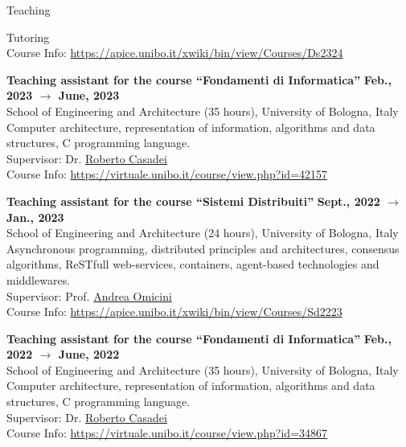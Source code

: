 \documentclass{resume} %
\begin{document}
\begin{rSection}{Teaching}
\begin{rSubsection2}{Tutoring}
            \\Course Info: \url{https://apice.unibo.it/xwiki/bin/view/Courses/Ds2324}
            \item\textbf{ Teaching assistant for the course ``Fondamenti di Informatica'' }\hfill \textbf{Feb., 2023 $\rightarrow$ June, 2023}
            \\School of Engineering and Architecture (35 hours), University of Bologna, Italy
            \\Computer architecture, representation of information, algorithms and data structures, C programming language.
            \\Supervisor: Dr. \href{mailto:roberto.casadei@unibo.it}{Roberto Casadei}
            \\Course Info: \url{https://virtuale.unibo.it/course/view.php?id=42157}
            \item\textbf{ Teaching assistant for the course ``Sistemi Distribuiti'' }\hfill \textbf{Sept., 2022 $\rightarrow$ Jan., 2023}
            \\School of Engineering and Architecture (24 hours), University of Bologna, Italy
            \\Asynchronous programming, distributed principles and architectures, consensus algorithms, ReSTfull web-services, containers, agent-based technologies and middlewares.
            \\Supervisor: Prof. \href{mailto:andrea.omicini@unibo.it}{Andrea Omicini}
            \\Course Info: \url{https://apice.unibo.it/xwiki/bin/view/Courses/Sd2223}
            \item\textbf{ Teaching assistant for the course ``Fondamenti di Informatica'' }\hfill \textbf{Feb., 2022 $\rightarrow$ June, 2022}
            \\School of Engineering and Architecture (35 hours), University of Bologna, Italy
            \\Computer architecture, representation of information, algorithms and data structures, C programming language.
            \\Supervisor: Dr. \href{mailto:roberto.casadei@unibo.it}{Roberto Casadei}
            \\Course Info: \url{https://virtuale.unibo.it/course/view.php?id=34867}
        \end{rSubsection2}



\end{rSection}
\end{document}
